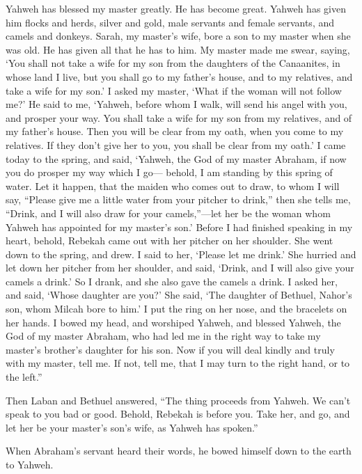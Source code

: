 {Yahweh has blessed my master greatly. He has become great. Yahweh has given him flocks and herds, silver and gold, male servants and female servants, and camels and donkeys.
Sarah, my master’s wife, bore a son to my master when she was old. He has given all that he has to him.
My master made me swear, saying, ‘You shall not take a wife for my son from the daughters of the Canaanites, in whose land I live,
but you shall go to my father’s house, and to my relatives, and take a wife for my son.’
I asked my master, ‘What if the woman will not follow me?’
He said to me, ‘Yahweh, before whom I walk, will send his angel with you, and prosper your way. You shall take a wife for my son from my relatives, and of my father’s house.
Then you will be clear from my oath, when you come to my relatives. If they don’t give her to you, you shall be clear from my oath.’
I came today to the spring, and said, ‘Yahweh, the God of my master Abraham, if now you do prosper my way which I go—
behold, I am standing by this spring of water. Let it happen, that the maiden who comes out to draw, to whom I will say, “Please give me a little water from your pitcher to drink,”
then she tells me, “Drink, and I will also draw for your camels,”—let her be the woman whom Yahweh has appointed for my master’s son.’
Before I had finished speaking in my heart, behold, Rebekah came out with her pitcher on her shoulder. She went down to the spring, and drew. I said to her, ‘Please let me drink.’
She hurried and let down her pitcher from her shoulder, and said, ‘Drink, and I will also give your camels a drink.’ So I drank, and she also gave the camels a drink.
I asked her, and said, ‘Whose daughter are you?’ She said, ‘The daughter of Bethuel, Nahor’s son, whom Milcah bore to him.’ I put the ring on her nose, and the bracelets on her hands.
I bowed my head, and worshiped Yahweh, and blessed Yahweh, the God of my master Abraham, who had led me in the right way to take my master’s brother’s daughter for his son.
Now if you will deal kindly and truly with my master, tell me. If not, tell me, that I may turn to the right hand, or to the left.”
\par }{\PP {}Then Laban and Bethuel answered, “The thing proceeds from Yahweh. We can’t speak to you bad or good.
Behold, Rebekah is before you. Take her, and go, and let her be your master’s son’s wife, as Yahweh has spoken.”
\par }{\PP {}When Abraham’s servant heard their words, he bowed himself down to the earth to Yahweh.
}
